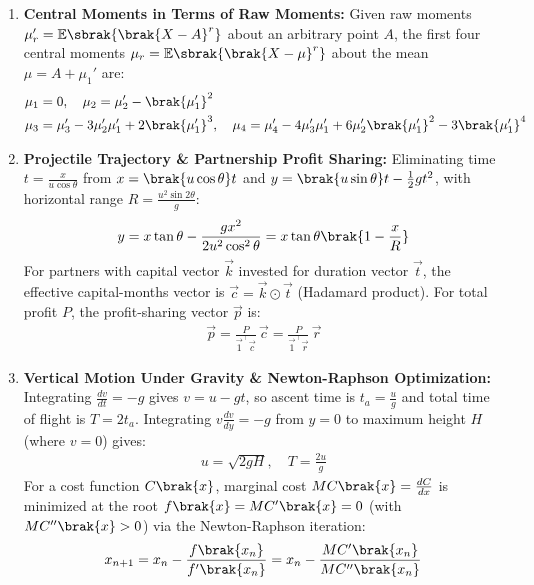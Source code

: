\begin{enumerate}[label=\thesubsection.\arabic*, ref=\thesubsection.\theenumi]
	\item \textbf{Central Moments in Terms of Raw Moments:}
	Given raw moments $\mu_r' = \mathbb{E}\sbrak{\brak{X - A}^r}$ about an arbitrary point $A$, the first four central moments $\mu_r = \mathbb{E}\sbrak{\brak{X - \mu}^r}$ about the mean $\mu = A + \mu_1'$ are:
	\begin{align}
		\mu_1 &= 0, \quad \mu_2 = \mu_2' - \brak{\mu_1'}^2 \nonumber \\
		\mu_3 &= \mu_3' - 3\mu_2'\mu_1' + 2\brak{\mu_1'}^3, \quad \mu_4 = \mu_4' - 4\mu_3'\mu_1' + 6\mu_2'\brak{\mu_1'}^2 - 3\brak{\mu_1'}^4 \label{eq:central_moments_formula}
	\end{align}
	
	\item \textbf{Projectile Trajectory \& Partnership Profit Sharing:}
	Eliminating time $t = \frac{x}{u\cos\theta}$ from $x = \brak{u\cos\theta}t$ and $y = \brak{u\sin\theta}t - \frac{1}{2}gt^2$, with horizontal range $R = \frac{u^2\sin 2\theta}{g}$:
	\begin{align}
		y = x\tan\theta - \frac{gx^2}{2u^2\cos^2\theta} = x\tan\theta\brak{1 - \frac{x}{R}} \label{eq:projectile_trajectory}
	\end{align}
	For partners with capital vector $\vec{k}$ invested for duration vector $\vec{t}$, the effective capital-months vector is $\vec{c} = \vec{k} \odot \vec{t}$ (Hadamard product). For total profit $P$, the profit-sharing vector $\vec{p}$ is:
	\begin{align}
		\vec{p} = \frac{P}{\vec{1}^{\top}\vec{c}}\,\vec{c} = \frac{P}{\vec{1}^{\top}\vec{r}}\,\vec{r} \label{eq:partnership_profit_vec}
	\end{align}
	
	\item \textbf{Vertical Motion Under Gravity \& Newton-Raphson Optimization:}
	Integrating $\frac{dv}{dt} = -g$ gives $v = u - gt$, so ascent time is $t_a = \frac{u}{g}$ and total time of flight is $T = 2t_a$. Integrating $v\frac{dv}{dy} = -g$ from $y = 0$ to maximum height $H$ (where $v = 0$) gives:
	\begin{align}
		u = \sqrt{2gH}, \quad T = \frac{2u}{g} \label{eq:vertical_motion_gravity}
	\end{align}
	For a cost function $C\brak{x}$, marginal cost $MC\brak{x} = \frac{dC}{dx}$ is minimized at the root $f\brak{x} = MC'\brak{x} = 0$ (with $MC''\brak{x} > 0$) via the Newton-Raphson iteration:
	\begin{align}
		x_{n+1} = x_n - \frac{f\brak{x_n}}{f'\brak{x_n}} = x_n - \frac{MC'\brak{x_n}}{MC''\brak{x_n}} \label{eq:newton_raphson_opt}
	\end{align}
	

\end{enumerate}
